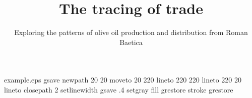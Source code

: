 %
%
%
%
%
\begin{filecontents*}{example.eps}
gsave
newpath
  20 20 moveto
  20 220 lineto
  220 220 lineto
  220 20 lineto
closepath
2 setlinewidth
gsave
  .4 setgray fill
grestore
stroke
grestore
\end{filecontents*}
%
\RequirePackage{fix-cm}
%
\documentclass[smallextended]{svjour3}       %
%
\smartqed  %
%

\usepackage{hyperref}
\usepackage{graphicx}
\usepackage{wrapfig}
\usepackage{lscape}
\usepackage{rotating}
%

\usepackage{natbib}
%



%
%
%
%
%



\title{The tracing of trade%
}
\subtitle{Exploring the patterns of olive oil production and distribution from Roman Baetica}

